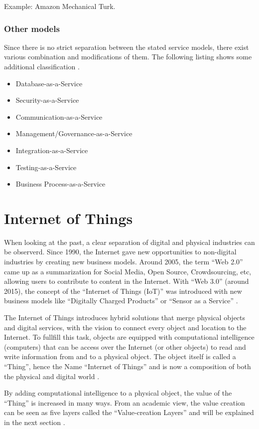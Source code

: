 Example: Amazon Mechanical Turk\cite{huaas}.

\subsubsection{Other models}
Since there is no strict separation between the stated service models, there exist various combination and modifications of them. The following listing shows some additional classification \cite{cloud_characteristics}.
\begin{itemize}
	\item Database-as-a-Service
	\item Security-as-a-Service
	\item Communication-as-a-Service
	\item Management/Governance-as-a-Service
	\item Integration-as-a-Service
	\item Testing-as-a-Service
	\item Business Process-as-a-Service
\end{itemize}

\section{Internet of Things}

When looking at the past, a clear separation of digital and physical industries can be observerd. Since 1990, the Internet gave new opportunities to non-digital industries by creating new business models. Around 2005, the term ``Web 2.0'' came up as a summarization for Social Media, Open Source, Crowdsourcing, etc, allowing users to contribute to content in the Internet. With ``Web 3.0'' (around 2015), the concept of the ``Internet of Things (IoT)'' was introduced with new business models like ``Digitally Charged Products'' or ``Sensor as a Service'' \cite{iotfleisch}.

The Internet of Things introduces hybrid solutions that merge physical objects and digital services, with the vision to connect every object and location to the Internet. To fullfill this task, objects are equipped with computational intelligence (computers) that can be access over the Internet (or other objects) to read and write information from and to a physical object. The object itself is called a ``Thing'', hence the Name ``Internet of Things'' and is now a composition of both the physical and digital world \cite{iotfleisch}.

By adding computational intelligence to a physical object, the value of the ``Thing'' is increased in many ways. From an academic view, the value creation can be seen as five layers called the ``Value-creation Layers'' and will be explained in the next section \cite{iotfleisch}.

